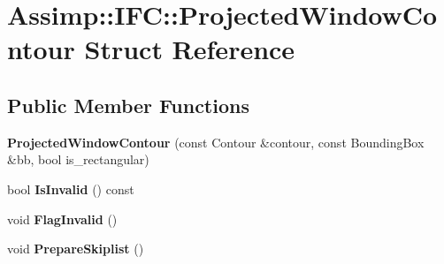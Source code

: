 \hypertarget{struct_assimp_1_1_i_f_c_1_1_projected_window_contour}{\section{Assimp\+:\+:I\+F\+C\+:\+:Projected\+Window\+Contour Struct Reference}
\label{struct_assimp_1_1_i_f_c_1_1_projected_window_contour}
}
\subsection*{Public Member Functions}
\begin{DoxyCompactItemize}
\item 
\hypertarget{struct_assimp_1_1_i_f_c_1_1_projected_window_contour_a1606f24619cf646ce11a3f5d1d136afe}{{\bfseries Projected\+Window\+Contour} (const Contour \&contour, const Bounding\+Box \&bb, bool is\+\_\+rectangular)}\label{struct_assimp_1_1_i_f_c_1_1_projected_window_contour_a1606f24619cf646ce11a3f5d1d136afe}

\item 
\hypertarget{struct_assimp_1_1_i_f_c_1_1_projected_window_contour_ad37004e80a90ac1f0ade91d141ccb718}{bool {\bfseries Is\+Invalid} () const }\label{struct_assimp_1_1_i_f_c_1_1_projected_window_contour_ad37004e80a90ac1f0ade91d141ccb718}

\item 
\hypertarget{struct_assimp_1_1_i_f_c_1_1_projected_window_contour_ac9ad2299c2fff5a3a430cc78f301503a}{void {\bfseries Flag\+Invalid} ()}\label{struct_assimp_1_1_i_f_c_1_1_projected_window_contour_ac9ad2299c2fff5a3a430cc78f301503a}

\item 
\hypertarget{struct_assimp_1_1_i_f_c_1_1_projected_window_contour_a4b9e53920fac48ad90300ce534137041}{void {\bfseries Prepare\+Skiplist} ()}\label{struct_assimp_1_1_i_f_c_1_1_projected_window_contour_a4b9e53920fac48ad90300ce534137041}

\end{DoxyCompactItemize}
